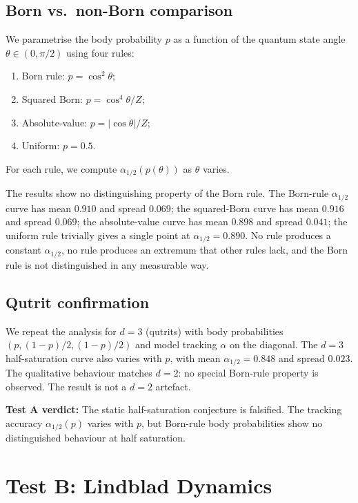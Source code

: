 \documentclass[12pt,a4paper]{article}
\begin{document}
\subsection{Born vs.\ non-Born comparison}

We parametrise the body probability $p$ as a function of the
quantum state angle $\theta \in (0, \pi/2)$ using four rules:
\begin{enumerate}[label=(\roman*)]
  \item Born rule: $p = \cos^2\theta$;
  \item Squared Born: $p = \cos^4\theta / Z$;
  \item Absolute-value: $p = |\cos\theta| / Z$;
  \item Uniform: $p = 0.5$.
\end{enumerate}
For each rule, we compute $\alpha_{1/2}(p(\theta))$ as $\theta$
varies.

The results show no distinguishing property of the Born rule.  The
Born-rule $\alpha_{1/2}$ curve has mean $0.910$ and spread $0.069$;
the squared-Born curve has mean $0.916$ and spread $0.069$; the
absolute-value curve has mean $0.898$ and spread $0.041$; the
uniform rule trivially gives a single point at $\alpha_{1/2} =
0.890$.  No rule produces a constant $\alpha_{1/2}$, no rule
produces an extremum that other rules lack, and the Born rule is
not distinguished in any measurable way.

\subsection{Qutrit confirmation}

We repeat the analysis for $d = 3$ (qutrits) with body
probabilities $(p, (1-p)/2, (1-p)/2)$ and model tracking
$\alpha$ on the diagonal.  The $d = 3$ half-saturation curve also
varies with $p$, with mean $\alpha_{1/2} = 0.848$ and spread
$0.023$.  The qualitative behaviour matches $d = 2$: no special
Born-rule property is observed.  The result is not a $d = 2$
artefact.

\medskip
\noindent\textbf{Test A verdict:} The static half-saturation
conjecture is falsified.  The tracking accuracy $\alpha_{1/2}(p)$
varies with $p$, but Born-rule body probabilities show no
distinguished behaviour at half saturation.

\section{Test B: Lindblad Dynamics}\label{sec:testB}
\end{document}
